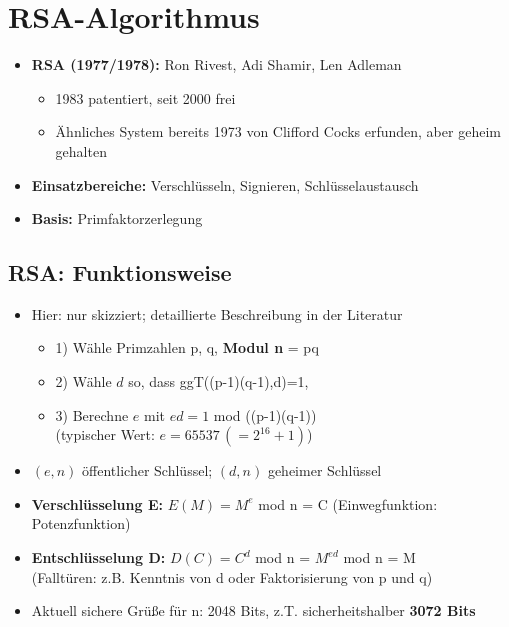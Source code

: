 \documentclass[openany]{book}
\begin{document}
\section{RSA-Algorithmus}

\begin{itemize}
    \item \textbf{RSA (1977/1978):} Ron Rivest, Adi Shamir, Len Adleman
    \begin{itemize}
        \item 1983 patentiert, seit 2000 frei
        \item Ähnliches System bereits 1973 von Clifford Cocks erfunden, aber geheim gehalten
    \end{itemize}
    \item \textbf{Einsatzbereiche:} Verschlüsseln, Signieren, Schlüsselaustausch
    \item \textbf{Basis:} Primfaktorzerlegung
\end{itemize}

\subsection{RSA: Funktionsweise}

\begin{itemize}
    \item Hier: nur skizziert; detaillierte Beschreibung in der Literatur
    \begin{itemize}
        \item 1) Wähle Primzahlen p, q, \textbf{Modul n} = pq
        \item 2) Wähle $d$ so, dass ggT((p-1)(q-1),d)=1,
        \item 3) Berechne $e$ mit $ed=1$ mod ((p-1)(q-1)) \\ (typischer Wert: $e=65537\, (=2^{16}+1)$)
    \end{itemize}
    \item $(e,n)$ öffentlicher Schlüssel; $(d,n)$ geheimer Schlüssel
    \item \textbf{Verschlüsselung E:} $E(M)=M^e$ mod n = C (Einwegfunktion: Potenzfunktion)
    \item \textbf{Entschlüsselung D:} $D(C) = C^d$ mod n = $M^{ed}$ mod n = M \\ (Falltüren: z.B. Kenntnis von d oder Faktorisierung von p und q)
    \item Aktuell sichere Grüße für n: 2048 Bits, z.T. sicherheitshalber \textbf{3072 Bits}  
\end{itemize}
\end{document}
